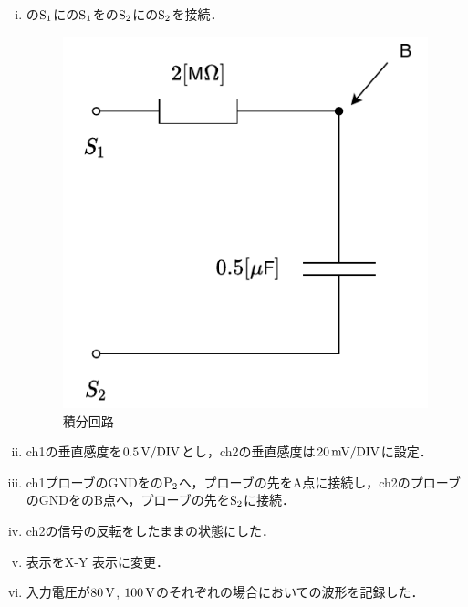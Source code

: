 \begin{enumerate}[(a)]
\begin{enumerate}[i)]
	\item {}の$\rm{S_{1}}$にの$\rm{S_{1}}$をの$\rm{S_{2}}$にの$\rm{S_{2}}$を接続．
	\begin{figure}[h]
	\centering
	\includegraphics[scale=1]{./fig/ad.pdf}
	\caption{積分回路}
	\label{fig:ad}
	\end{figure}
	\item ch1の垂直感度を$0.5\,\rm{V/DIV}$とし，ch2の垂直感度は$20\,\rm{mV/DIV}$に設定．
	\item ch1プローブのGNDをの$\rm{P_{2}}$へ，プローブの先をA点に接続し，ch2のプローブのGNDをのB点へ，プローブの先を$\rm{S_{2}}$に接続．
	\item ch2の信号の反転をしたままの状態にした．
	\item 表示をX-Y 表示に変更．
	\item 入力電圧が$80\,\rm{V}$, $100\,\rm{V}$のそれぞれの場合においての波形を記録した．
\end{enumerate}
\end{enumerate}
